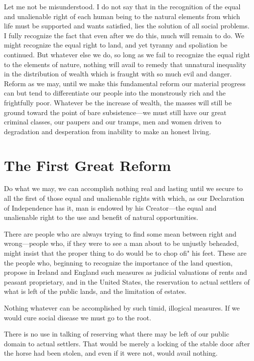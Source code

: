 \documentclass{book}
\begin{document}
Let me not be misunderstood. I do not say that in the recognition of the equal and unalienable right of each human being to the natural elements from which life must be supported and wants satisfied, lies the solution of all social problems. I fully recognize the fact that even after we do this, much will remain to do. We might recognize the equal right to land, and yet tyranny and spoliation be continued. But whatever else we do, so long as we fail to recognize the equal right to the elements of nature, nothing will avail to remedy that unnatural inequality in the distribution of wealth which is fraught with so much evil and danger. Reform as we may, until we make this fundamental reform our material progress can but tend to differentiate our people into the monstrously rich and the frightfully poor. Whatever be the increase of wealth, the masses will still be ground toward the point of bare subsistence—we must still have our great criminal classes, our paupers and our tramps, men and women driven to degradation and desperation from inability to make an honest living.

\chapter{The First Great Reform}
\label{chapter-19}
Do what we may, we can accomplish nothing real and lasting until we secure to all the first of those equal and unalienable rights with which, as our Declaration of Independence has it, man is endowed by his Creator—the equal and unalienable right to the use and benefit of natural opportunities.

There are people who are always trying to find some mean between right and wrong—people who, if they were to see a man about to be unjustly beheaded, might insist that the proper thing to do would be to chop ofi" his feet. These are the people who, beginning to recognize the importance of the land question, propose in Ireland and England such measures as judicial valuations of rents and peasant proprietary, and in the United States, the reservation to actual settlers of what is left of the public lands, and the limitation of estates.

Nothing whatever can be accomplished by such timid, illogical measures. If we would cure social disease we must go to the root.

There is no use in talking of reserving what there may be left of our public domain to actual settlers. That would be merely a locking of the stable door after the horse had been stolen, and even if it were not, would avail nothing.
\end{document}
